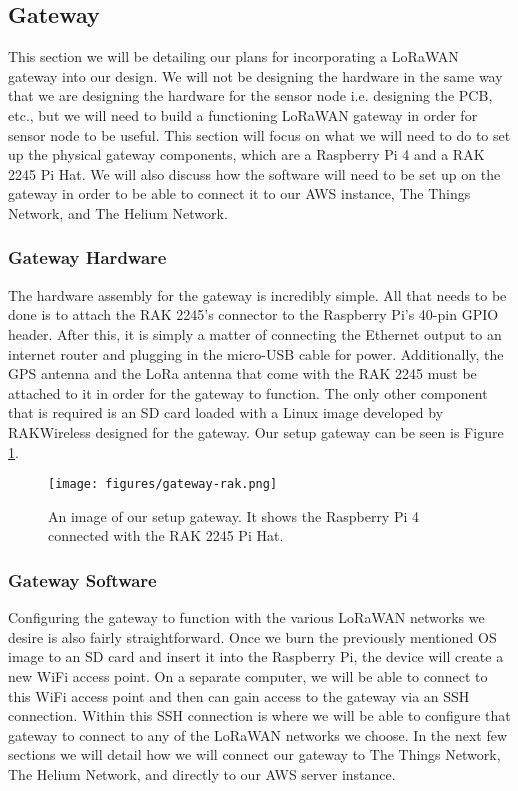 \subsection{Gateway}
This section we will be detailing our plans for incorporating a LoRaWAN gateway into our design. We will not be designing the hardware in the same way that we are designing the hardware for the sensor node i.e. designing the PCB, etc., but we will need to build a functioning LoRaWAN gateway in order for sensor node to be useful. This section will focus on what we will need to do to set up the physical gateway components, which are a Raspberry Pi 4 and a RAK 2245 Pi Hat. We will also discuss how the software will need to be set up on the gateway in order to be able to connect it to our AWS instance, The Things Network, and The Helium Network.

\subsubsection{Gateway Hardware}
The hardware assembly for the gateway is incredibly simple. All that needs to be done is to attach the RAK 2245's connector to the Raspberry Pi's 40-pin GPIO header. After this, it is simply a matter of connecting the Ethernet output to an internet router and plugging in the micro-USB cable for power. Additionally, the GPS antenna and the LoRa antenna that come with the RAK 2245 must be attached to it in order for the gateway to function. The only other component that is required is an SD card loaded with a Linux image developed by RAKWireless designed for the gateway. Our setup gateway can be seen is Figure \ref{fig:gateway-rak}.

\begin{figure}
    \centering
    \texttt{[image: figures/gateway-rak.png]}
    \caption{An image of our setup gateway. It shows the Raspberry Pi 4 connected with the RAK 2245 Pi Hat.}
    \label{fig:gateway-rak} 
\end{figure}

\subsubsection{Gateway Software}
Configuring the gateway to function with the various LoRaWAN networks we desire is also fairly straightforward. Once we burn the previously mentioned OS image to an SD card and insert it into the Raspberry Pi, the device will create a new WiFi access point. On a separate computer, we will be able to connect to this WiFi access point and then can gain access to the gateway via an SSH connection. Within this SSH connection is where we will be able to configure that gateway to connect to any of the LoRaWAN networks we choose. In the next few sections we will detail how we will connect our gateway to The Things Network, The Helium Network, and directly to our AWS server instance.


